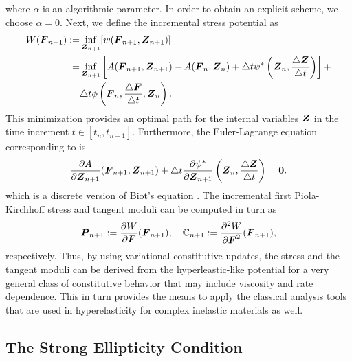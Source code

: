 \documentclass[12pt]{article}
\numberwithin{equation}{section}
\begin{document}
where $\alpha$ is an algorithmic parameter. In order to obtain an
explicit scheme, we choose $\alpha = 0$. Next, we define the
incremental stress potential as
\begin{equation} \label{eq:incremental-stress-potential}
  \begin{split}
    W({\boldsymbol{F}}_{n+1})
    :=
    &
    \inf_{{\boldsymbol{Z}}_{n+1}}[w({\boldsymbol{F}}_{n+1}, {\boldsymbol{Z}}_{n+1})]
    \\
    =
    &
    \inf_{{\boldsymbol{Z}}_{n+1}}
    \left[
      A({\boldsymbol{F}}_{n+1}, {\boldsymbol{Z}}_{n+1}) - A({\boldsymbol{F}}_n, {\boldsymbol{Z}}_n)
      +
      \triangle t
      \psi^*\left({\boldsymbol{Z}}_n, \frac{\triangle {\boldsymbol{Z}}}{\triangle t}\right)
    \right]
    +
    \\
    &
    \triangle t
    \phi\left({\boldsymbol{F}}_n, \frac{\triangle {\boldsymbol{F}}}{\triangle t}, {\boldsymbol{Z}}_n\right).
  \end{split}
\end{equation}
This minimization provides an optimal path for the internal variables
${\boldsymbol{Z}}$ in the time increment $t \in [t_n, t_{n+1}]$. Furthermore, the
Euler-Lagrange equation corresponding to
 is
\begin{equation} \label{eq:Biots-equation-discrete}
  \frac{\partial A}{\partial {\boldsymbol{Z}}_{n+1}}({\boldsymbol{F}}_{n+1}, {\boldsymbol{Z}}_{n+1})
  +
  \triangle t
  \frac{\partial \psi^*}{\partial {\boldsymbol{Z}}_{n+1}}
  \left({\boldsymbol{Z}}_n, \frac{\triangle {\boldsymbol{Z}}}{\triangle t}\right)
  =
  \mathbf{0}.
\end{equation}
which is a discrete version of Biot's equation
 \citep{Miehe:Schotte:Lambrecht:2002}. The
incremental first Piola-Kirchhoff stress and tangent moduli can be
computed in turn as
\begin{equation} \label{eq:incremental-stress-moduli}
  {\boldsymbol{P}}_{n+1} := \frac{\partial W}{\partial {\boldsymbol{F}}} ({\boldsymbol{F}}_{n+1}),
  \quad
  \mathbb{C}_{n+1} := \frac{\partial^2 W}{\partial {\boldsymbol{F}}^2} ({\boldsymbol{F}}_{n+1}),
\end{equation}
respectively. Thus, by using variational constitutive updates, the
stress and the tangent moduli can be derived from the
hyperleastic-like potential 
for a very general class of constitutive behavior that may include
viscosity and rate dependence. This in turn provides the means to
apply the classical analysis tools that are used in hyperelasticity
for complex inelastic materials as well.

\subsection{The Strong Ellipticity Condition}
\end{document}
